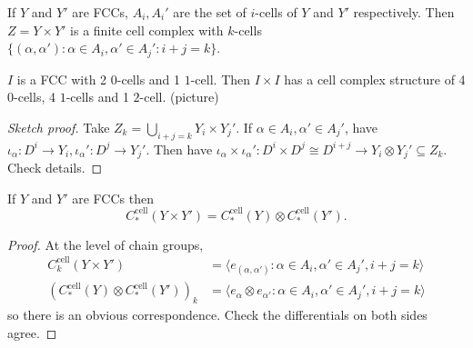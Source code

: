 \documentclass[a4paper]{article}
\newcommand{\cell}{\mathrm{cell}}
\begin{document}
\begin{proposition}
  If \(Y\) and \(Y'\) are FCCs, \(A_i, A_i'\) are the set of \(i\)-cells of \(Y\) and \(Y'\) respectively. Then \(Z = Y \times Y'\) is a finite cell complex with \(k\)-cells \(\{(\alpha, \alpha'): \alpha \in A_i, \alpha' \in A_j': i + j = k\}\).
\end{proposition}

\begin{eg}
  \(I\) is a FCC with 2 \(0\)-cells and 1 \(1\)-cell. Then \(I \times I\) has a cell complex structure of 4 \(0\)-cells, 4 \(1\)-cells and 1 \(2\)-cell. (picture)
\end{eg}

\begin{proof}[Sketch proof]
  Take \(Z_k = \bigcup_{i + j = k} Y_i \times Y_j'\). If \(\alpha \in A_i, \alpha' \in A_j'\), have \(\iota_\alpha: D^i \to Y_i, \iota_\alpha': D^j \to Y_j'\). Then have \(\iota_\alpha \times \iota_\alpha': D^i \times D^j \cong D^{i + j} \to Y_i \otimes Y_j' \subseteq Z_k\). Check details.
\end{proof}

\begin{theorem}
  If \(Y\) and \(Y'\) are FCCs then
  \[
    C_*^\cell(Y \times Y') = C_*^\cell(Y) \otimes C_*^\cell(Y').
  \]
\end{theorem}

\begin{proof}
  At the level of chain groups,
  \begin{align*}
    C_k^\cell(Y \times Y') &= \langle e_{(\alpha, \alpha')}: \alpha \in A_i, \alpha' \in A_j', i + j = k \rangle \\
    (C_*^\cell(Y) \otimes C_*^\cell(Y'))_k &= \langle e_\alpha \otimes e_{\alpha'}: \alpha \in A_i, \alpha' \in A_j', i + j = k \rangle
  \end{align*}
  so there is an obvious correspondence. Check the differentials on both sides agree.
\end{proof}
\end{document}

